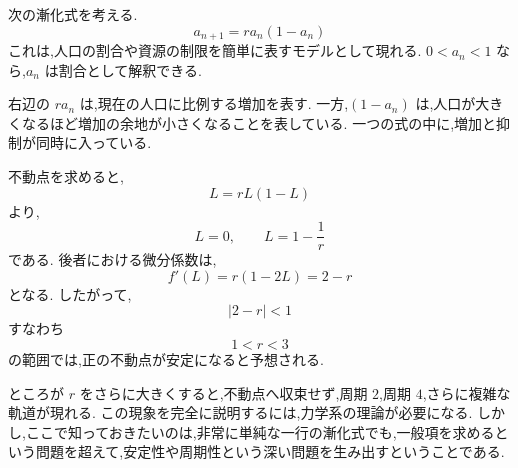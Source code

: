 次の漸化式を考える.
\[
  a_{n+1}=r a_n(1-a_n)
\]
これは,人口の割合や資源の制限を簡単に表すモデルとして現れる.
$0<a_n<1$ なら,$a_n$ は割合として解釈できる.

右辺の $ra_n$ は,現在の人口に比例する増加を表す.
一方,$(1-a_n)$ は,人口が大きくなるほど増加の余地が小さくなることを表している.
一つの式の中に,増加と抑制が同時に入っている.

不動点を求めると,
\[
  L=rL(1-L)
\]
より,
\[
  L=0,\qquad L=1-\frac1r
\]
である.
後者における微分係数は,
\[
  f'(L)=r(1-2L)=2-r
\]
となる.
したがって,
\[
  |2-r|<1
\]
すなわち
\[
  1<r<3
\]
の範囲では,正の不動点が安定になると予想される.

ところが $r$ をさらに大きくすると,不動点へ収束せず,周期 $2$,周期 $4$,さらに複雑な軌道が現れる.
この現象を完全に説明するには,力学系の理論が必要になる.
しかし,ここで知っておきたいのは,非常に単純な一行の漸化式でも,一般項を求めるという問題を超えて,安定性や周期性という深い問題を生み出すということである.
